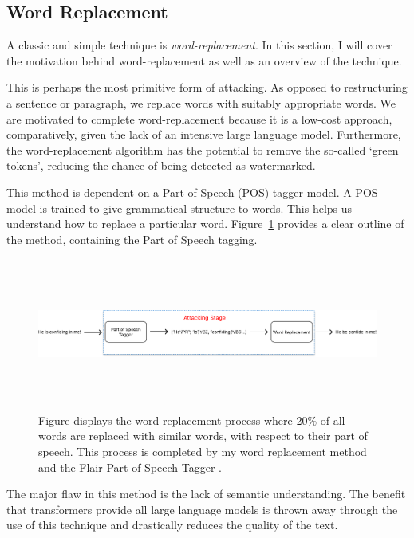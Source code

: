 \documentclass{l4proj}
\theoremstyle{definition}
\begin{document}
    \subsection{Word Replacement}
        A classic and simple technique is \emph{word-replacement}. In this section, I will cover the motivation behind word-replacement as well as an overview of the technique.

        This is perhaps the most primitive form of attacking. As opposed to restructuring a sentence or paragraph, we replace words with suitably appropriate words. We are motivated to complete word-replacement because it is a low-cost approach, comparatively, given the lack of an intensive large language model. Furthermore, the word-replacement algorithm has the potential to remove the so-called `green tokens', reducing the chance of being detected as watermarked.  

        This method is dependent on a Part of Speech (POS) tagger model. A POS model is trained to give grammatical structure to words. This helps us understand how to replace a particular word. Figure~\ref{fig:word-replacement-process} provides a clear outline of the method, containing the Part of Speech tagging. 

        \begin{figure}[ht]
            \centering
            \includegraphics[height=5cm, width=1\linewidth, keepaspectratio]{images/background/word-replacement-process.pdf}
            \caption{Figure displays the word replacement process where 20\% of all words are replaced with similar words, with respect to their part of speech. This process is completed by my word replacement method and the Flair Part of Speech Tagger \citep{akbik2018coling}.}
            \label{fig:word-replacement-process}
        \end{figure}
        
        The major flaw in this method is the lack of semantic understanding. The benefit that transformers provide all large language models is thrown away through the use of this technique and drastically reduces the quality of the text.
        
\end{document}
